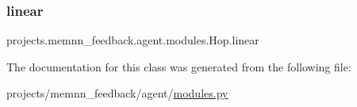 \mbox{\label{classprojects_1_1memnn__feedback_1_1agent_1_1modules_1_1Hop_a373c95e927a46152f811742f2653030f}} 
\subsubsection{\texorpdfstring{linear}{linear}}
{\footnotesize\ttfamily projects.\+memnn\+\_\+feedback.\+agent.\+modules.\+Hop.\+linear}



The documentation for this class was generated from the following file\+:\begin{DoxyCompactItemize}
\item 
projects/memnn\+\_\+feedback/agent/\hyperlink{projects_2memnn__feedback_2agent_2modules_8py}{modules.\+py}\end{DoxyCompactItemize}
